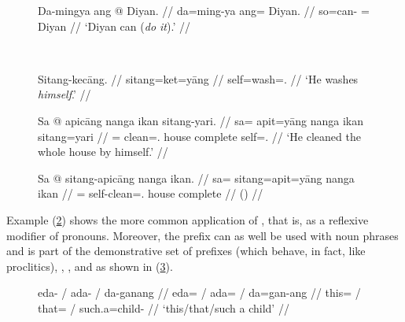 \begin{figure}[h]
\begin{minipage}[t]{.5\linewidth}
\ex\label{ex:davb}
\begingl
	\gla Da-mingya ang @ Diyan. //
	\glb da=ming-ya ang= Diyan. //
	\glc so=can-\TsgM{} \Aarg{}= Diyan //
	\glft `Diyan can (\emph{do it}).' //
\endgl
\xe
\end{minipage}
~
\begin{minipage}[t]{.5\linewidth} 
\ex\label{ex:sitangvb}
\begingl
	\gla Sitang-kecāng. //
	\glb sitang=ket=yāng //
	\glc self=wash=\TsgM{}.\Aarg{} //
	\glft `He washes \emph{himself}.' //
\endgl\xe
\end{minipage}
\end{figure}

\begin{figure}[h]
\pex\label{ex:sitangpronvb}
\a\label{ex:sitang+pronoun}\begingl
	\gla Sa @ apicāng nanga ikan sitang-yari. //
	\glb sa= apit=yāng nanga ikan sitang=yari //
	\glc \PatT{}= clean=\Tsg{}.\Aarg{} house complete 
		self=\TsgM{}.\Ins{} //
	\glft `He cleaned the whole house by himself.' //
\endgl

\a\begingl
	\gla Sa @ sitang-apicāng nanga ikan. //
	\glb sa= sitang=apit=yāng nanga ikan //
	\glc \PatT{}= self-clean=\Tsg{}.\Aarg{} house complete //
	\glft () //
\endgl
\xe
\end{figure}

\label{nounprefixes}
Example (\ref{ex:sitang+pronoun}) shows the more common application of 
, that is, as a reflexive modifier of pronouns. Moreover,
the prefix  can as well be used with noun phrases and is part of
the demonstrative set of prefixes (which behave, in fact, like proclitics),
, , and  as shown in (\ref{ex:dempfxs}).

\begin{figure}[h]
\ex\label{ex:dempfxs}\begingl
	\gla eda- / ada- / da-ganang //
	\glb eda= / ada= / da=gan-ang //
	\glc this= / that= / such.a=child-\Aarg{} //
	\glft `this/that/such a child' //
\endgl\xe
\end{figure}

